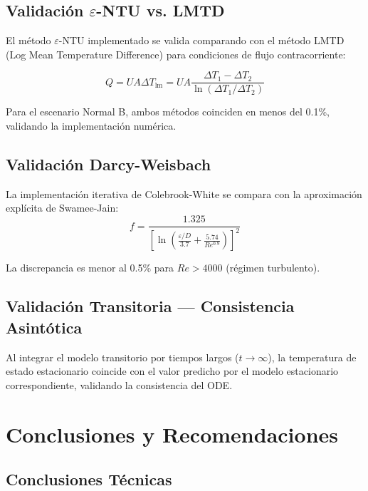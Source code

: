 \documentclass[11pt,a4paper]{report}
\begin{document}
\section{Validación $\varepsilon$-NTU vs. LMTD}

El método $\varepsilon$-NTU implementado se valida comparando con el método LMTD (Log Mean Temperature Difference) para condiciones de flujo contracorriente:

\begin{equation}
Q = U A \Delta T_{\text{lm}} = U A \frac{\Delta T_1 - \Delta T_2}{\ln(\Delta T_1 / \Delta T_2)}
\end{equation}

Para el escenario Normal B, ambos métodos coinciden en menos del 0.1\%, validando la implementación numérica.

\section{Validación Darcy-Weisbach}

La implementación iterativa de Colebrook-White se compara con la aproximación explícita de Swamee-Jain:
\begin{equation}
f = \frac{1.325}{\left[\ln\left(\frac{\varepsilon/D}{3.7} + \frac{5.74}{Re^{0.9}}\right)\right]^2}
\end{equation}

La discrepancia es menor al 0.5\% para $Re > 4000$ (régimen turbulento).

\section{Validación Transitoria — Consistencia Asintótica}

Al integrar el modelo transitorio por tiempos largos ($t \to \infty$), la temperatura de estado estacionario coincide con el valor predicho por el modelo estacionario correspondiente, validando la consistencia del ODE.

\chapter{Conclusiones y Recomendaciones}

\section{Conclusiones Técnicas}
\end{document}

